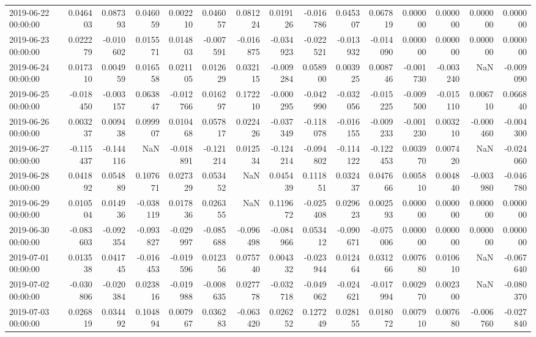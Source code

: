 \begin{tabular}{lrrrrrrrrrrrrrr}
2019-06-22 00:00:00 & 0.046403 & 0.087393 & 0.046059 & 0.002210 & 0.046057 & 0.081224 & 0.019126 & -0.016786 & 0.045307 & 0.067819 & 0.000000 & 0.000000 & 0.000000 & 0.000000 \\
2019-06-23 00:00:00 & 0.022279 & -0.010602 & 0.015571 & 0.014803 & -0.007591 & -0.016875 & -0.034923 & -0.022521 & -0.013932 & -0.014090 & 0.000000 & 0.000000 & 0.000000 & 0.000000 \\
2019-06-24 00:00:00 & 0.017310 & 0.004959 & 0.016558 & 0.021105 & 0.012629 & 0.032115 & -0.009284 & 0.058900 & 0.003925 & 0.008746 & -0.001730 & -0.003240 & NaN & -0.009090 \\
2019-06-25 00:00:00 & -0.018450 & -0.003157 & 0.063847 & -0.012766 & 0.016297 & 0.172210 & -0.000295 & -0.042990 & -0.032056 & -0.015225 & -0.009500 & -0.015110 & 0.006710 & 0.066840 \\
2019-06-26 00:00:00 & 0.003237 & 0.009438 & 0.099907 & 0.010468 & 0.057817 & 0.022426 & -0.037349 & -0.118078 & -0.016155 & -0.009233 & -0.001230 & 0.003210 & -0.000460 & -0.004300 \\
2019-06-27 00:00:00 & -0.115437 & -0.144116 & NaN & -0.018891 & -0.121214 & 0.012534 & -0.124214 & -0.094802 & -0.114122 & -0.122453 & 0.003970 & 0.007420 & NaN & -0.024060 \\
2019-06-28 00:00:00 & 0.041892 & 0.054889 & 0.107671 & 0.027329 & 0.053452 & NaN & 0.045439 & 0.111851 & 0.032437 & 0.047666 & 0.005810 & 0.004840 & -0.003980 & -0.046780 \\
2019-06-29 00:00:00 & 0.010504 & 0.014936 & -0.038119 & 0.017836 & 0.026355 & NaN & 0.119672 & -0.025408 & 0.029623 & 0.002593 & 0.000000 & 0.000000 & 0.000000 & 0.000000 \\
2019-06-30 00:00:00 & -0.083603 & -0.092354 & -0.093827 & -0.029997 & -0.085688 & -0.096498 & -0.084966 & 0.053412 & -0.090671 & -0.075006 & 0.000000 & 0.000000 & 0.000000 & 0.000000 \\
2019-07-01 00:00:00 & 0.013538 & 0.041745 & -0.016453 & -0.019596 & 0.012356 & 0.075740 & 0.004332 & -0.023944 & 0.012464 & 0.031266 & 0.007680 & 0.010610 & NaN & -0.067640 \\
2019-07-02 00:00:00 & -0.030806 & -0.020384 & 0.023816 & -0.019988 & -0.008635 & 0.027778 & -0.032718 & -0.049062 & -0.024621 & -0.017994 & 0.002970 & 0.002300 & NaN & -0.080370 \\
2019-07-03 00:00:00 & 0.026819 & 0.034492 & 0.104894 & 0.007967 & 0.036283 & -0.063420 & 0.026252 & 0.127249 & 0.028155 & 0.018072 & 0.007910 & 0.007680 & -0.006760 & -0.027840 \\

\end{tabular}

